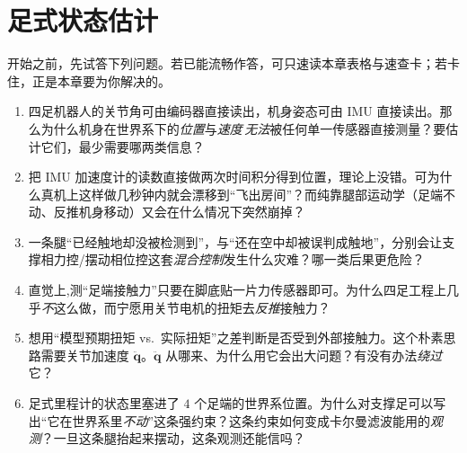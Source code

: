 \chapter{足式状态估计}
\label{ch:quad_est}



\begin{practice}[前置自测]
开始之前，先试答下列问题。若已能流畅作答，可只速读本章表格与速查卡；若卡住，正是本章要为你解决的。
\begin{enumerate}
  \item 四足机器人的关节角可由编码器直接读出，机身姿态可由 IMU 直接读出。那么为什么机身在世界系下的\emph{位置}与\emph{速度}\,\emph{无法}被任何单一传感器直接测量？要估计它们，最少需要哪两类信息？
  \item 把 IMU 加速度计的读数直接做两次时间积分得到位置，理论上没错。可为什么真机上这样做几秒钟内就会漂移到“飞出房间”？而纯靠腿部运动学（足端不动、反推机身移动）又会在什么情况下突然崩掉？
  \item 一条腿“已经触地却没被检测到”，与“还在空中却被误判成触地”，分别会让支撑相力控/摆动相位控这套\emph{混合控制}发生什么灾难？哪一类后果更危险？
  \item 直觉上,测“足端接触力”只要在脚底贴一片力传感器即可。为什么四足工程上几乎\emph{不}这么做，而宁愿用关节电机的扭矩去\emph{反推}接触力？
  \item 想用“模型预期扭矩 vs.\ 实际扭矩”之差判断是否受到外部接触力。这个朴素思路需要关节加速度 $\ddot{\boldsymbol q}$。$\ddot{\boldsymbol q}$ 从哪来、为什么用它会出大问题？有没有办法\emph{绕过}它？
  \item 足式里程计的状态里塞进了 $4$ 个足端的世界系位置。为什么对支撑足可以写出“它在世界系里\emph{不动}”这条强约束？这条约束如何变成卡尔曼滤波能用的\emph{观测}？一旦这条腿抬起来摆动，这条观测还能信吗？
\end{enumerate}
\end{practice}

